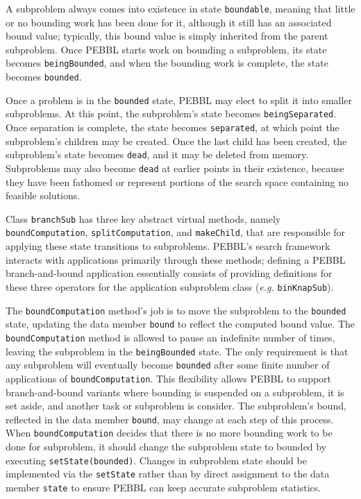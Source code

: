 A subproblem always comes into existence in state \texttt{boundable},
meaning that little or no bounding work has been done for it, although
it still has an associated bound value; typically, this bound value is
simply inherited from the parent subproblem.  Once PEBBL starts work on
bounding a subproblem, its state becomes \texttt{beingBounded}, and
when the bounding work is complete, the state becomes
\texttt{bounded}.

Once a problem is in the \texttt{bounded} state, PEBBL may elect to
split it into smaller subproblems.  At this point, the subproblem's
state becomes \texttt{beingSeparated}.  Once separation is complete,
the state becomes \texttt{separated}, at which point the subproblem's
children may be created.  Once the last child has been created, the
subproblem's state becomes \texttt{dead}, and it may be deleted from
memory.  Subproblems may also become \texttt{dead} at earlier points
in their existence, because they have been fathomed or represent
portions of the search space containing no feasible solutions.

Class \texttt{branchSub} has three key abstract virtual methods,
namely \texttt{boundComputation}, \texttt{splitComputation}, and
\texttt{makeChild}, that are responsible for applying these state
transitions to subproblems.  PEBBL's search framework interacts with
applications primarily through these methods; defining a PEBBL
branch-and-bound application essentially consists of providing
definitions for these three operators for the application subproblem
class ({\em e.g.} \texttt{binKnapSub}).

The \texttt{boundComputation} method's job is to move the subproblem
to the \texttt{bounded} state, updating the data member \texttt{bound}
to reflect the computed bound value.  The \texttt{boundComputation} method
is allowed to pause an indefinite number of times, leaving the
subproblem in the \texttt{beingBounded} state.  The only requirement
is that any subproblem will eventually become \texttt{bounded} after
some finite number of applications of \texttt{boundComputation}.  This
flexibility allows PEBBL to support branch-and-bound variants where 
bounding is suspended on a subproblem, it is set aside, and another
task or subproblem is consider.  The
subproblem's bound, reflected in the data member \texttt{bound}, may
change at each step of this process.  When \texttt{boundComputation}
decides that there is no more bounding work to be done for subproblem,
it should change the subproblem state to bounded by executing
\texttt{setState(bounded)}.  Changes in subproblem state should be
implemented via the \texttt{setState} rather than by direct assignment
to the data member \texttt{state} to ensure PEBBL can keep accurate
subproblem statistics.

